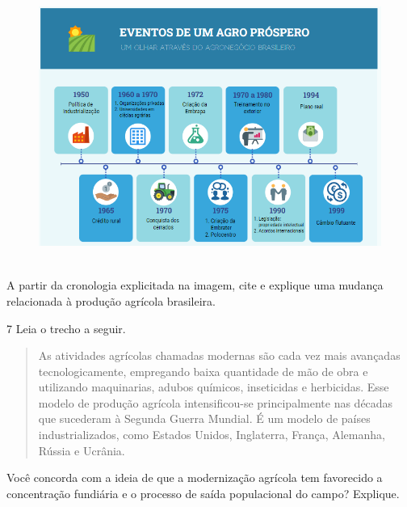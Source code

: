 \begin{figure}
\centering
\includegraphics[width=5.04002in,height=3.51806in]{./imgSAEB_9_CHUM6/media/image3.png}
\end{figure}

A partir da cronologia explicitada na imagem, cite e explique uma
mudança relacionada à produção agrícola brasileira.


\num{7} Leia o trecho a seguir.

\begin{quote}
As atividades agrícolas chamadas modernas são cada vez mais avançadas
tecnologicamente, empregando baixa quantidade de mão de obra e
utilizando maquinarias, adubos químicos, inseticidas e herbicidas. Esse
modelo de produção agrícola intensificou-se principalmente nas décadas
que sucederam à Segunda Guerra Mundial. É um modelo de países
industrializados, como Estados Unidos, Inglaterra, França, Alemanha,
Rússia e Ucrânia.

\end{quote}

Você concorda com a ideia de que a modernização agrícola tem favorecido
a concentração fundiária e o processo de saída populacional do campo?
Explique.

